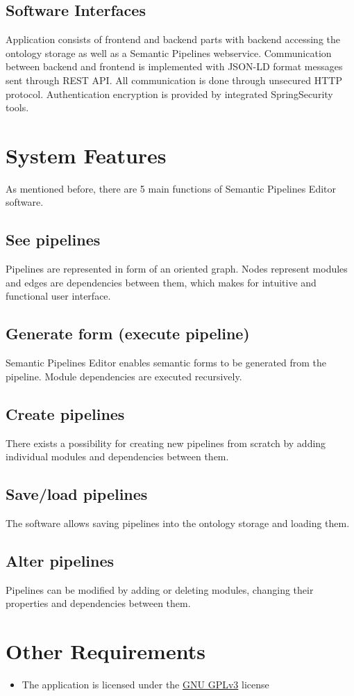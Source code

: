 \documentclass{article}
\begin{document}
\subsection{Software Interfaces}
Application consists of frontend and backend parts with backend accessing the ontology storage as well as a Semantic Pipelines webservice. Communication between backend and frontend is implemented with JSON-LD format messages sent through REST API. All communication is done through unsecured HTTP protocol. Authentication encryption is provided by integrated SpringSecurity tools. 
\section{System Features}
\label{sec:features}
As mentioned before, there are 5 main functions of Semantic Pipelines Editor software.
\subsection{See pipelines}
Pipelines are represented in form of an oriented graph. Nodes represent modules and edges are dependencies between them, which makes for intuitive and functional user interface.
\subsection{Generate form (execute pipeline)}
Semantic Pipelines Editor enables semantic forms to be generated from the pipeline. Module dependencies are executed recursively.
\subsection{Create pipelines}
There exists a possibility for creating new pipelines from scratch by adding individual modules and dependencies between them.
\subsection{Save/load pipelines}
The software allows saving pipelines into the ontology storage and loading them.
\subsection{Alter pipelines}
Pipelines can be modified by adding or deleting modules, changing their properties and dependencies between them.
\section{Other Requirements}
\begin{itemize}
    \item The application is licensed under the \href{https://www.gnu.org/licenses/gpl.txt}{GNU GPLv3} license
\end{itemize}
\end{document}
